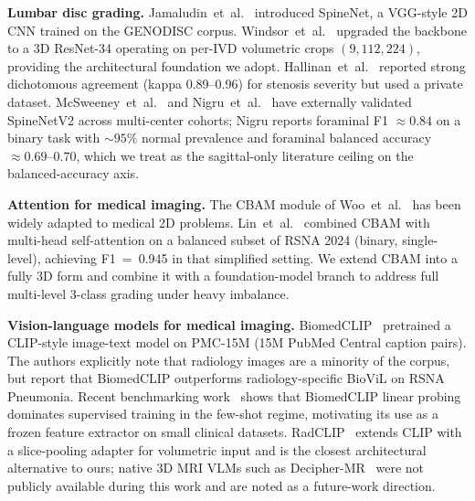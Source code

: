 \documentclass[conference]{IEEEtran}
\begin{document}
\textbf{Lumbar disc grading.}
Jamaludin~et~al.~\cite{jamaludin2017} introduced SpineNet, a VGG-style
2D CNN trained on the GENODISC corpus. Windsor~et~al.~\cite{windsor2022}
upgraded the backbone to a 3D ResNet-34 operating on per-IVD volumetric
crops $(9,112,224)$, providing the architectural foundation we adopt.
Hallinan~et~al.~\cite{hallinan2021} reported strong dichotomous
agreement (kappa 0.89--0.96) for stenosis severity but used a private
dataset. McSweeney~et~al.~\cite{mcsweeney2023} and Nigru~et~al.~\cite{nigru2024}
have externally validated SpineNetV2 across multi-center cohorts; Nigru
reports foraminal F1 $\approx 0.84$ on a binary task with $\sim 95\%$
normal prevalence and foraminal balanced accuracy $\approx 0.69$--$0.70$,
which we treat as the sagittal-only literature ceiling on the
balanced-accuracy axis.

\textbf{Attention for medical imaging.}
The CBAM module of Woo~et~al.~\cite{woo2018cbam} has been widely
adapted to medical 2D problems. Lin~et~al.~\cite{lin2024cbam} combined
CBAM with multi-head self-attention on a balanced subset of RSNA 2024
(binary, single-level), achieving F1~=~0.945 in that simplified
setting. We extend CBAM into a fully 3D form and combine it with a
foundation-model branch to address full multi-level 3-class grading
under heavy imbalance.

\textbf{Vision-language models for medical imaging.}
BiomedCLIP~\cite{zhang2023biomedclip} pretrained a CLIP-style
image-text model on PMC-15M (15M PubMed Central caption pairs). The
authors explicitly note that radiology images are a minority of the
corpus, but report that BiomedCLIP outperforms radiology-specific
BioViL on RSNA Pneumonia. Recent benchmarking work~\cite{datascarcity2024}
shows that BiomedCLIP linear probing dominates supervised training in
the few-shot regime, motivating its use as a frozen feature extractor on
small clinical datasets. RadCLIP~\cite{lu2024radclip} extends CLIP with
a slice-pooling adapter for volumetric input and is the closest
architectural alternative to ours; native 3D MRI VLMs such as
Decipher-MR~\cite{yang2026deciphermr} were not publicly available
during this work and are noted as a future-work direction.
\end{document}
